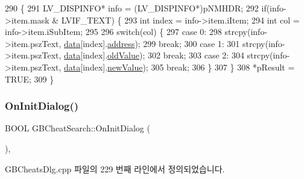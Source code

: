 \begin{DoxyCode}
290 \{
291   LV\_DISPINFO* info = (LV\_DISPINFO*)pNMHDR;
292   \textcolor{keywordflow}{if}(info->item.mask & LVIF\_TEXT) \{
293     \textcolor{keywordtype}{int} index = info->item.iItem;
294     \textcolor{keywordtype}{int} col = info->item.iSubItem;
295     
296     \textcolor{keywordflow}{switch}(col) \{
297     \textcolor{keywordflow}{case} 0:
298       strcpy(info->item.pszText, \mbox{\hyperlink{class_g_b_cheat_search_a3b53d05af5d79a51830df8d06256e1fc}{data}}[index].\mbox{\hyperlink{struct_win_gb_cheats_data_a7d260c5c47f95346767df3da6838221c}{address}});
299       \textcolor{keywordflow}{break};
300     \textcolor{keywordflow}{case} 1:
301       strcpy(info->item.pszText, \mbox{\hyperlink{class_g_b_cheat_search_a3b53d05af5d79a51830df8d06256e1fc}{data}}[index].\mbox{\hyperlink{struct_win_gb_cheats_data_abe8e108df6ab1b40209bdc2e3e490c8a}{oldValue}});
302       \textcolor{keywordflow}{break};
303     \textcolor{keywordflow}{case} 2:
304       strcpy(info->item.pszText, \mbox{\hyperlink{class_g_b_cheat_search_a3b53d05af5d79a51830df8d06256e1fc}{data}}[index].\mbox{\hyperlink{struct_win_gb_cheats_data_a6fc49b4d1e4bb935624c98a337091eb9}{newValue}});
305       \textcolor{keywordflow}{break};
306     \}
307   \}
308   *pResult = TRUE;
309 \}
\end{DoxyCode}
\mbox{\label{class_g_b_cheat_search_a8aba3602d876fba97b2ef5195dc0b648}} 
\subsubsection{\texorpdfstring{On\+Init\+Dialog()}{OnInitDialog()}}
{\footnotesize\ttfamily B\+O\+OL G\+B\+Cheat\+Search\+::\+On\+Init\+Dialog (\begin{DoxyParamCaption}{ }\end{DoxyParamCaption})\hspace{0.3cm}{\ttfamily [protected]}, {\ttfamily [virtual]}}



G\+B\+Cheats\+Dlg.\+cpp 파일의 229 번째 라인에서 정의되었습니다.



